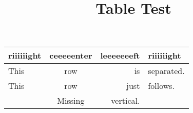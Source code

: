 
\title{Table Test}
\date{}



\begin{tabular}{|l|cr|l|}
 \textbf{riiiiiight} & \textbf{ceeeeenter} & \textbf{leeeeeeeft} & \textbf{riiiiiight}
\\ \hline
This & row & is & separated.
\\ This & row & just & follows.
\\  & Missing & vertical. &
\end{tabular}



